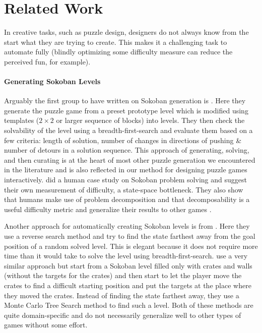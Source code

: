 
\setcounter{chapter}{1}

\chapter{Related Work}
In creative tasks, such as puzzle design, designers do not always know from the start what they are trying to create. This makes it a challenging task to automate fully (blindly optimizing some difficulty measure can reduce the perceived fun, for example).

\subsubsection{Generating Sokoban Levels}

Arguably the first group to have written on Sokoban generation is \cite{Science1996}. Here they generate the puzzle game from a preset prototype level which is modified using templates ($2 \times 2$ or larger sequence of blocks) into levels. They then check the solvability of the level using a breadth-first-search and evaluate them based on a few criteria: length of solution, number of changes in directions of pushing \& number of detours in a solution sequence. This approach of generating, solving, and then curating is at the heart of most other puzzle generation we encountered in the literature and is also reflected in our method for designing puzzle games interactively.
\cite{Pelanek2011} did a human case study on Sokoban problem solving and suggest their own measurement of difficulty, a state-space bottleneck. They also show that humans make use of problem decomposition and that decomposability is a useful difficulty metric and generalize their results to other games \cite{Jaru}.

Another approach for automatically creating Sokoban levels is from \cite{Taylor2011}. Here they use a reverse search method and try to find the state farthest away from the goal position of a random solved level. This is elegant because it does not require more time than it would take to solve the level using breadth-first-search. \cite{Kartal2015} use a very similar approach but start from a Sokoban level filled only with crates and walls (without the targets for the crates) and then start to let the player move the crates to find a difficult starting position and put the targets at the place where they moved the crates. Instead of finding the state farthest away, they use a Monte Carlo Tree Search method to find such a level. Both of these methods are quite domain-specific and do not necessarily generalize well to other types of games without some effort.

